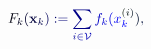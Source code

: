 \documentclass[12pt]{article}
\begin{document}
\makeatletter
\renewcommand*{\@textcolor}[3]{%
  \protect\leavevmode
  \begingroup
    \color#1{#2}#3%
  \endgroup
}
\makeatother
\begin{displaymath}
\mathcolor[RGB]{0,0,15}{F} _ { \mathcolor[RGB]{0,0,30}{k} } \mathcolor[RGB]{0,0,45}{(} \mathbf { \mathcolor[RGB]{0,0,60}{x} } _ { \mathcolor[RGB]{0,0,75}{k} } \mathcolor[RGB]{0,0,90}{)} \mathcolor[RGB]{0,0,105}{:} \mathcolor[RGB]{0,0,120}{=} \mathcolor[RGB]{0,0,135}{\sum} _ { \mathcolor[RGB]{0,0,150}{i} \mathcolor[RGB]{0,0,165}{\in} \mathcal { \mathcolor[RGB]{0,0,180}{V} } } \mathcolor[RGB]{0,0,195}{f} _ { \mathcolor[RGB]{0,0,210}{k} } \mathcolor[RGB]{0,0,225}{(} \mathcolor[RGB]{0,0,240}{x} _ { \mathcolor[RGB]{0,0,255}{k} } ^ { \mathcolor[RGB]{0,15,0}{(} \mathcolor[RGB]{0,15,15}{i} \mathcolor[RGB]{0,15,30}{)} } \mathcolor[RGB]{0,15,45}{)} \mathcolor[RGB]{0,15,60}{,}
\end{displaymath}
\end{document}
